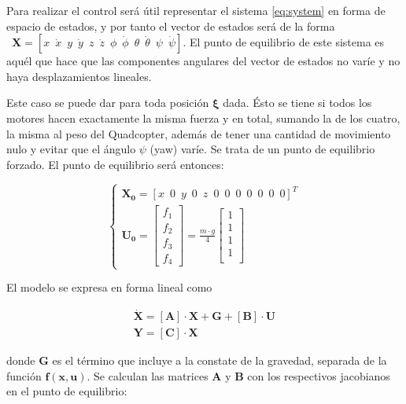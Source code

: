 \documentclass[twoside,11pt]{book}
\begin{document}
Para realizar el control será útil representar el sistema \ref{eq:system}  en forma de espacio de estados, y por tanto el vector de estados será de la forma $\enspace \pmb{X}=\left[ x \enspace \dot{x} \enspace y \enspace \dot{y} \enspace z \enspace \dot{z} \enspace \phi \enspace \dot{\phi} \enspace \theta \enspace \dot{\theta} \enspace \psi \enspace \dot{\psi} \right]$. El punto de equilibrio de este sistema es aquél que hace que las componentes angulares del vector de estados no varíe y no haya desplazamientos lineales. 

Este caso se puede dar para toda posición $\pmb{\xi}$ dada. Ésto se tiene si todos los motores hacen exactamente la misma fuerza y en total, sumando la de los cuatro, la misma al peso del Quadcopter, además de tener una cantidad de movimiento nulo y evitar que el ángulo  $\psi$ (yaw) varíe. Se trata de un punto de equilibrio forzado. El punto de equilibrio será entonces:

\begin{equation}
\begin{cases}
\pmb{X_0}=\left[x \enspace 0 \enspace y \enspace 0 \enspace z \enspace 0 \enspace 0 \enspace 0 \enspace 0 \enspace 0 \enspace 0 \enspace 0 \right]^{T} \\
\pmb{U_0}=\left[ \begin{array}{l}
f_{1} \\
f_{2} \\
f_{3} \\
f_{4} \end{array} \right] = \frac{m \cdot g}{4} \left[ \begin{array}{l}
1 \\
1 \\
1 \\
1 \\ \end{array} \right]
\end{cases}
\end{equation}

El modelo se expresa en forma lineal como

\begin{equation}
\begin{array}{l}
\pmb{\dot{X}}=[\pmb{A}] \cdot \pmb{X} + \pmb{G} + [\pmb{B}] \cdot \pmb{U} \\
\pmb{Y} = [\pmb{C}] \cdot \pmb{X} 
\end{array}
\end{equation} 

donde $\pmb{G}$ es el término que incluye a la constate de la gravedad, separada de la función $\pmb{f(x,u)}$. Se calculan las matrices $\pmb{A}$ y $\pmb{B}$ con los respectivos jacobianos en el punto de equilibrio:
\end{document}
